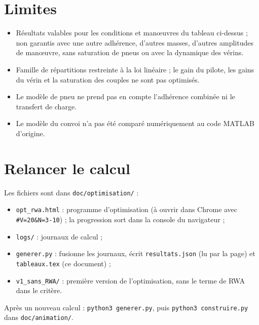 \documentclass[a4paper,11pt]{article}
\begin{document}
\section{Limites}
\begin{itemize}
  \item Résultats valables pour les conditions et manœuvres du tableau ci-dessus ; non garantis avec une autre adhérence, d'autres masses, d'autres amplitudes de manœuvre, sans saturation de pneus ou avec la dynamique des vérins.
  \item Famille de répartitions restreinte à la loi linéaire ; le gain du pilote, les gains du vérin et la saturation des couples ne sont pas optimisés.
  \item Le modèle de pneu ne prend pas en compte l'adhérence combinée ni le transfert de charge.
  \item Le modèle du convoi n'a pas été comparé numériquement au code MATLAB d'origine.
\end{itemize}

\section{Relancer le calcul}
Les fichiers sont dans \texttt{doc/optimisation/} :
\begin{itemize}
  \item \texttt{opt\_rwa.html} : programme d'optimisation (à ouvrir dans Chrome avec \texttt{\#V=20\&N=3-10}) ; la progression sort dans la console du navigateur ;
  \item \texttt{logs/} : journaux de calcul ;
  \item \texttt{generer.py} : fusionne les journaux, écrit \texttt{resultats.json} (lu par la page) et \texttt{tableaux.tex} (ce document) ;
  \item \texttt{v1\_sans\_RWA/} : première version de l'optimisation, sans le terme de RWA dans le critère.
\end{itemize}
Après un nouveau calcul : \texttt{python3 generer.py}, puis \texttt{python3 construire.py} dans \texttt{doc/animation/}.
\end{document}
